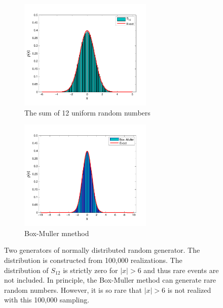 \begin{figure}
	\centering
	\begin{subfigure}{0.45\textwidth}
		\centering
		\includegraphics[width=2.5in]{15.Random-Numbers/normal12.pdf}
		\caption{The sum of 12 uniform random numbers}
		\label{fig:normal12}
	\end{subfigure}
	\begin{subfigure}{0.45\textwidth}
		\centering
		\includegraphics[width=2.5in]{15.Random-Numbers/box-muller.pdf}
		\caption{Box-Muller mnethod}
		\label{fig:box-muller}
	\end{subfigure}
\caption{Two generators of normally distributed random generator.  The distribution is constructed from 100,000 realizations. The distribution of $S_{12}$ is strictly zero for $|x|>6$ and thus rare events are not included. In principle, the Box-Muller method can generate rare random numbers.  However, it is so rare that $|x|>6$ is not realized with this 100,000 sampling.}
\end{figure}

